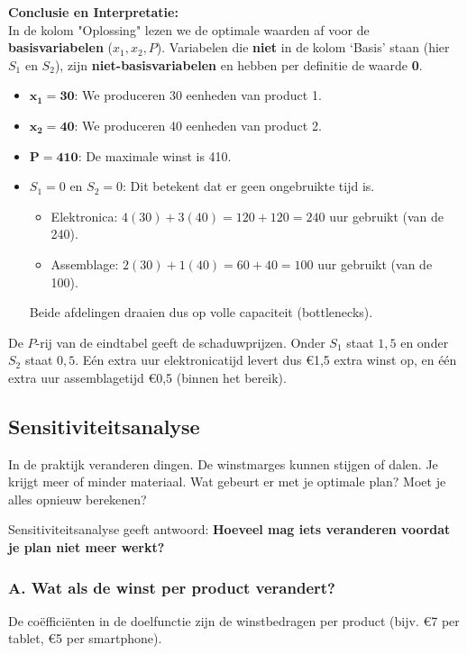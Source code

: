 \documentclass[a4paper,11pt]{article}
\begin{document}
\textbf{Conclusie en Interpretatie:} \\
In de kolom "Oplossing" lezen we de optimale waarden af voor de \textbf{basisvariabelen} ($x_1, x_2, P$).
Variabelen die \textbf{niet} in de kolom `Basis' staan (hier $S_1$ en $S_2$), zijn \textbf{niet-basisvariabelen}
en hebben per definitie de waarde \textbf{0}.

\begin{itemize}
    \item $\mathbf{x_1 = 30}$: We produceren 30 eenheden van product 1.
    \item $\mathbf{x_2 = 40}$: We produceren 40 eenheden van product 2.
    \item $\mathbf{P = 410}$: De maximale winst is 410.
    \item $S_1 = 0$ en $S_2 = 0$: Dit betekent dat er geen ongebruikte tijd is.
          \begin{itemize}
              \item Elektronica: $4(30) + 3(40) = 120 + 120 = 240$ uur gebruikt (van de 240).
              \item Assemblage: $2(30) + 1(40) = 60 + 40 = 100$ uur gebruikt (van de 100).
          \end{itemize}
          Beide afdelingen draaien dus op volle capaciteit (bottlenecks).
\end{itemize}

De $P$-rij van de eindtabel geeft de schaduwprijzen. Onder $S_1$ staat $1{,}5$ en onder $S_2$ staat $0{,}5$. Eén extra uur elektronicatijd levert dus €1,5 extra winst op, en één extra uur assemblagetijd €0,5 (binnen het bereik).

\subsection{Sensitiviteitsanalyse}

In de praktijk veranderen dingen. De winstmarges kunnen stijgen of dalen. Je krijgt meer of minder materiaal. Wat gebeurt er met je optimale plan? Moet je alles opnieuw berekenen?

Sensitiviteitsanalyse geeft antwoord: \textbf{Hoeveel mag iets veranderen voordat je plan niet meer werkt?}

\subsubsection{A. Wat als de winst per product verandert?}

\begin{theorieblok}
    De coëfficiënten in de doelfunctie zijn de winstbedragen per product (bijv. €7 per tablet, €5 per smartphone).
\end{theorieblok}
\end{document}
